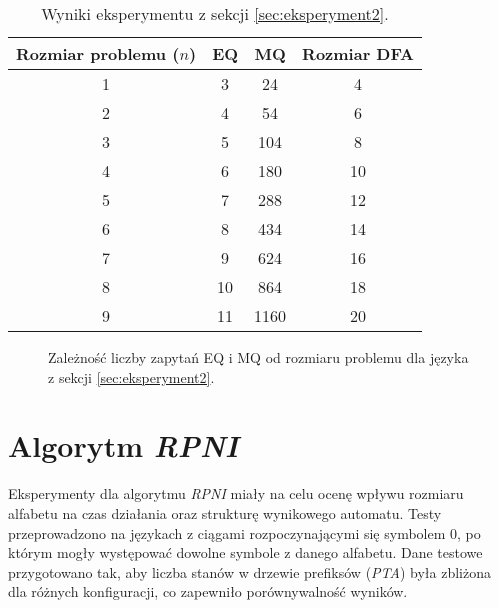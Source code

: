 \begin{table}[h]
\centering
\caption{Wyniki eksperymentu z sekcji \ref{sec:eksperyment2}.}
\label{tab:lstar_blocks}
\begin{tabular}{|c|c|c|c|}
\hline
Rozmiar problemu (\(n\)) & EQ & MQ & Rozmiar DFA \\ \hline
1                        & 3  & 24  & 4           \\ \hline
2                        & 4  & 54  & 6           \\ \hline
3                        & 5  & 104 & 8           \\ \hline
4                        & 6  & 180 & 10          \\ \hline
5                        & 7  & 288 & 12          \\ \hline
6                        & 8  & 434 & 14          \\ \hline
7                        & 9  & 624 & 16          \\ \hline
8                        & 10 & 864 & 18          \\ \hline
9                        & 11 & 1160 & 20         \\ \hline
\end{tabular}
\end{table}

\begin{figure}[h]
\centering
{}
\caption{Zależność liczby zapytań EQ i MQ od rozmiaru problemu dla języka z sekcji \ref{sec:eksperyment2}.}
\label{fig:lstar_blocks_mq}
\end{figure}


\section{Algorytm \textit{RPNI}}  
Eksperymenty dla algorytmu \textit{RPNI} miały na celu ocenę wpływu rozmiaru alfabetu na czas działania oraz strukturę wynikowego automatu. Testy przeprowadzono na językach z ciągami rozpoczynającymi się symbolem \( 0 \), po którym mogły występować dowolne symbole z danego alfabetu. Dane testowe przygotowano tak, aby liczba stanów w drzewie prefiksów (\textit{PTA}) była zbliżona dla różnych konfiguracji, co zapewniło porównywalność wyników.  


